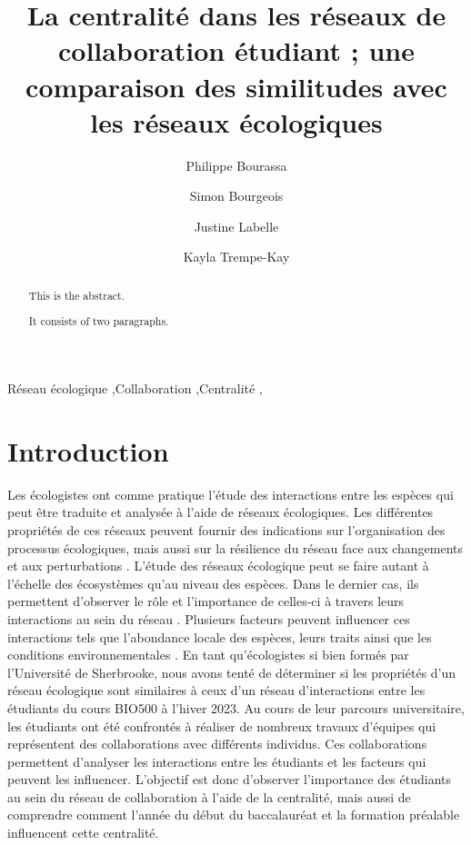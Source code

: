 \documentclass[preprint, 3p,
authoryear]{elsarticle} %
\begin{document}
\begin{frontmatter}

  \title{La centralité dans les réseaux de collaboration étudiant ; une
comparaison des similitudes avec les réseaux écologiques}
    \author[]{Philippe Bourassa%
  }
    \author[]{Simon Bourgeois%
  }
    \author[]{Justine Labelle%
  }
    \author[]{Kayla Trempe-Kay%
  }
  
  \begin{abstract}
  This is the abstract.

  It consists of two paragraphs.
  \end{abstract}
    \begin{keyword}
    Réseau écologique \sep Collaboration \sep Centralité \sep 
    
  \end{keyword}
  
 \end{frontmatter}

\hypertarget{introduction}{%
\section{Introduction}\label{introduction}}

Les écologistes ont comme pratique l'étude des interactions entre les
espèces qui peut être traduite et analysée à l'aide de réseaux
écologiques. Les différentes propriétés de ces réseaux peuvent fournir
des indications sur l'organisation des processus écologiques, mais aussi
sur la résilience du réseau face aux changements et aux perturbations
\citep{delmas2019analysing}. L'étude des réseaux écologique peut se
faire autant à l'échelle des écosystèmes qu'au niveau des espèces. Dans
le dernier cas, ils permettent d'observer le rôle et l'importance de
celles-ci à travers leurs interactions au sein du réseau
\citep{delmas2019analysing}. Plusieurs facteurs peuvent influencer ces
interactions tels que l'abondance locale des espèces, leurs traits ainsi
que les conditions environnementales \citep{delmas2019analysing}. En
tant qu'écologistes si bien formés par l'Université de Sherbrooke, nous
avons tenté de déterminer si les propriétés d'un réseau écologique sont
similaires à ceux d'un réseau d'interactions entre les étudiants du
cours BIO500 à l'hiver 2023. Au cours de leur parcours universitaire,
les étudiants ont été confrontés à réaliser de nombreux travaux
d'équipes qui représentent des collaborations avec différents individus.
Ces collaborations permettent d'analyser les interactions entre les
étudiants et les facteurs qui peuvent les influencer. L'objectif est
donc d'observer l'importance des étudiants au sein du réseau de
collaboration à l'aide de la centralité, mais aussi de comprendre
comment l'année du début du baccalauréat et la formation préalable
influencent cette centralité.
\end{document}
